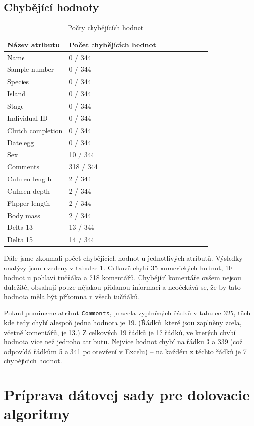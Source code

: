 \documentclass[10pt,xcolor=pdflatex,dvipsnames,table,oneside]{book}
\begin{document}
\section*{Chybějící hodnoty}
\begin{table}[]
  \centering
  \begin{tabular}{|l|l|l|l|l|l|l|l|l|}
    \hline
     \textbf{Název atributu} & \textbf{Počet chybějících hodnot} \\ \hline
     Name & 0 / 344 \\ \hline
     Sample number &  0 / 344 \\ \hline
     Species & 0 / 344\\ \hline
     Island & 0 / 344\\ \hline
     Stage & 0 / 344 \\ \hline
     Individual ID & 0 / 344 \\ \hline
     Clutch completion & 0 / 344\\ \hline
     Date egg & 0 / 344 \\ \hline
     Sex & 10 / 344 \\ \hline
     Comments & 318 / 344 \\ \hline
     Culmen length & 2 / 344\\ \hline
     Culmen depth & 2 / 344\\ \hline
     Flipper length & 2 / 344\\ \hline
     Body mass & 2 / 344\\ \hline
     Delta 13 & 13 / 344\\ \hline
     Delta 15 & 14 / 344 \\ \hline
  \end{tabular}
  \caption{Počty chybějících hodnot}
  \label{tab:missing}
\end{table}

Dále jsme zkoumali počet chybějících hodnot u jednotlivých atributů. Výsledky analýzy jsou uvedeny v tabulce \ref{tab:missing}.
Celkově chybí 35 numerických hodnot, 10 hodnot u pohlaví tučňáka a 318 komentářů. Chybějící komentáře ovšem nejsou důležité, obsahují pouze nějakou přidanou informaci a neočekává se, že by tato hodnota měla být přítomna u všech tučňáků. 

Pokud pomineme atribut \texttt{Comments}, je zcela vyplněných řádků v tabulce 325, těch kde tedy chybí alespoň jedna hodnota je 19. (Řádků, které jsou zaplněny zcela, včetně komentářů, je 13.) 
Z celkových 19 řádků je 13 řádků, ve kterých chybí hodnota více než jednoho atributu. Nejvíce hodnot chybí na řádku 3 a 339 (což odpovídá řádkům 5 a 341 po otevření v Excelu) -- na každém z těchto řádků je 7 chybějících hodnot. 



\chapter{Príprava dátovej sady pre dolovacie algoritmy}
\end{document}
